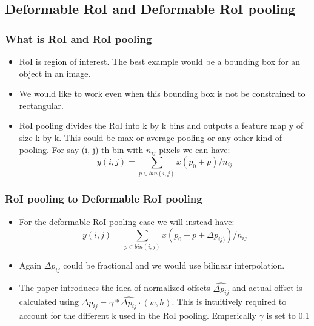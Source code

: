 \documentclass{beamer}
\begin{document}
\subsection{Deformable RoI and Deformable RoI pooling}
\begin{frame}
  \frametitle{What is RoI and RoI pooling}
  \begin{itemize}
  \item RoI is region of interest. The best example would be a bounding box for an object in an image.
  \item We would like to work even when this bounding box is not be constrained to rectangular.
  \item RoI pooling divides the RoI into k by k bins and outputs a feature map y of size k-by-k. This could be max or average pooling or any other kind of pooling. For say (i, j)-th bin with $n_{ij}$ pixels we can have:
    $$y(i, j) = \sum_{p \in bin(i,j)}x(p_0 + p)/n_{ij}$$
  \end{itemize}
\end{frame}

\begin{frame}
  \frametitle{RoI pooling to Deformable RoI pooling}
  \begin{itemize}
  \item For the deformable RoI pooling case we will instead have: $$y(i, j) = \sum_{p \in bin(i,j)}x(p_0 + p + \Delta p_{ij)})/n_{ij}$$
  \item Again $\Delta p_{ij}$ could be fractional and we would use bilinear interpolation.
  \item The paper introduces the idea of normalized offsets $\hat{\Delta{p_{ij}}}$ and actual offset is calculated using $\Delta p_{ij} = \gamma *  \hat{\Delta{p_{ij}}} \cdot(w, h)$. This is intuitively required to account for the different k used in the RoI pooling. Emperically $\gamma$ is set to 0.1
  \end{itemize}
\end{frame}



\end{document}
